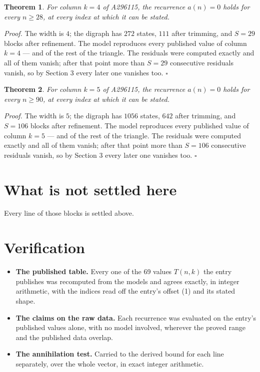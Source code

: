 \documentclass[11pt]{article}
\newtheorem{theorem}{Theorem}
\theoremstyle{definition}
\begin{document}
\begin{theorem} For column $k = 4$ of A296115, the recurrence $a(n) = 0$ holds for every $n \ge 28$, at every index at which it can be stated.\end{theorem}

{\itshape Proof.} The width is $4$; the digraph has $272$ states, $111$ after trimming, and $S = 29$ blocks after refinement. The model reproduces every published value of column $k = 4$ --- and of the rest of the triangle. The residuals were computed exactly and all of them vanish; after that point more than $S = 29$ consecutive residuals vanish, so by Section 3 every later one vanishes too. $\square$

\begin{theorem} For column $k = 5$ of A296115, the recurrence $a(n) = 0$ holds for every $n \ge 90$, at every index at which it can be stated.\end{theorem}

{\itshape Proof.} The width is $5$; the digraph has $1056$ states, $642$ after trimming, and $S = 106$ blocks after refinement. The model reproduces every published value of column $k = 5$ --- and of the rest of the triangle. The residuals were computed exactly and all of them vanish; after that point more than $S = 106$ consecutive residuals vanish, so by Section 3 every later one vanishes too. $\square$

\section{What is not settled here}

Every line of those blocks is settled above.

\section{Verification}

\begin{itemize}

\item {\bfseries The published table.} Every one of the 69 values $T(n,k)$ the entry publishes was recomputed from the models and agrees exactly, in integer arithmetic, with the indices read off the entry's offset (1) and its stated shape.

\item {\bfseries The claims on the raw data.} Each recurrence was evaluated on the entry's published values alone, with no model involved, wherever the proved range and the published data overlap.

\item {\bfseries The annihilation test.} Carried to the derived bound for each line separately, over the whole vector, in exact integer arithmetic.

\end{itemize}
\end{document}
